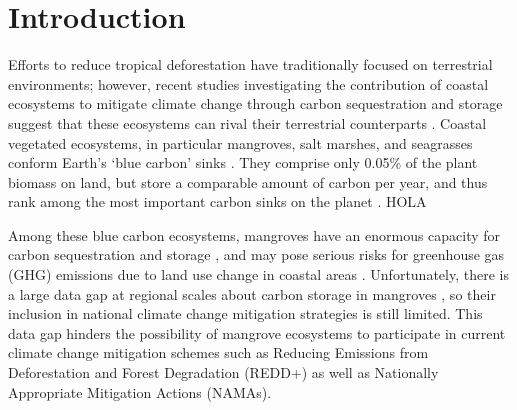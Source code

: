 \documentclass[review, authoryear]{elsarticle}   	%
\begin{document}
\linenumbers

\section{Introduction}

Efforts to reduce tropical deforestation have traditionally focused on terrestrial environments; however, recent studies investigating the contribution of coastal ecosystems to mitigate climate change through carbon sequestration and storage suggest that these ecosystems can rival their terrestrial counterparts \citep{Yee2010}. Coastal vegetated ecosystems, in particular mangroves, salt marshes, and seagrasses conform Earth's `blue carbon' sinks \citep{Herr2012}. They comprise only  0.05\% of the plant biomass on land, but store a comparable amount of carbon per year, and thus rank among the most important carbon sinks on the planet \citep{Nellemann2009}. HOLA


Among these blue carbon ecosystems, mangroves have an enormous capacity for carbon sequestration and storage \citep{Nellemann2009, Donato2011, Adame2013}, and may pose serious risks for greenhouse gas (GHG) emissions due to land use change in coastal areas \citep{WorldBank2010}. Unfortunately, there is a large data gap at regional scales about carbon storage in mangroves \citep{Donato2011}, so their inclusion in national climate change mitigation strategies is still limited. This data gap hinders the possibility of mangrove ecosystems to participate in current climate change mitigation schemes such as Reducing Emissions from Deforestation and Forest Degradation (REDD+) as well as Nationally Appropriate Mitigation Actions (NAMAs)\citep{Alongi2011, Herr2012, Murray2012, Boucher2014}. %
\end{document}
